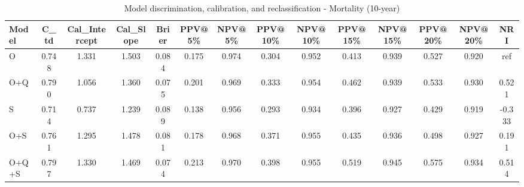 \begin{table}[htbp]
\centering
\small
\caption{Model discrimination, calibration, and reclassification - Mortality (10-year)}
\label{tab:perf_mortality_10y}
\begin{tabular}{lccccccccccccc}
\toprule
Model & C\_td & Cal\_Intercept & Cal\_Slope & Brier & PPV@5\% & NPV@5\% & PPV@10\% & NPV@10\% & PPV@15\% & NPV@15\% & PPV@20\% & NPV@20\% & NRI \\
\midrule
O & 0.748 & 1.331 & 1.503 & 0.084 & 0.175 & 0.974 & 0.304 & 0.952 & 0.413 & 0.939 & 0.527 & 0.920 & ref \\
O+Q & 0.790 & 1.056 & 1.360 & 0.075 & 0.201 & 0.969 & 0.333 & 0.954 & 0.462 & 0.939 & 0.533 & 0.930 & 0.521 \\
S & 0.714 & 0.737 & 1.239 & 0.089 & 0.138 & 0.956 & 0.293 & 0.934 & 0.396 & 0.927 & 0.429 & 0.919 & -0.333 \\
O+S & 0.761 & 1.295 & 1.478 & 0.081 & 0.178 & 0.968 & 0.371 & 0.955 & 0.435 & 0.936 & 0.498 & 0.927 & 0.191 \\
O+Q+S & 0.797 & 1.330 & 1.469 & 0.074 & 0.213 & 0.970 & 0.398 & 0.955 & 0.519 & 0.945 & 0.575 & 0.934 & 0.514 \\
\bottomrule
\end{tabular}
\end{table}